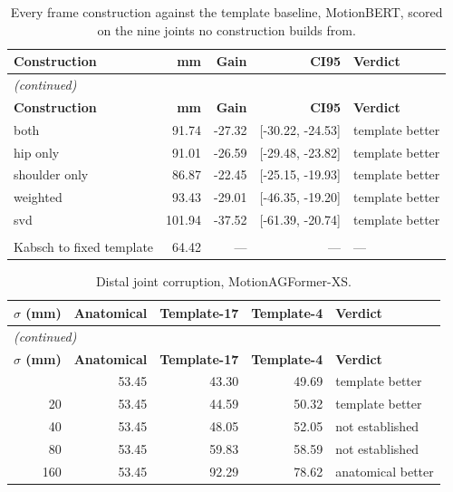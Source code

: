 \vspace{0.6cm}

\begin{center}
{\fontsize{10}{12}\selectfont
\begin{longtable}{lrrrl}
\caption{Every frame construction against the template baseline, MotionBERT, scored on the nine joints no construction builds from.}\label{tab:appbestframe_motionbert}\\
\hline
\textbf{Construction} & \textbf{mm} & \textbf{Gain} & \textbf{CI95} & \textbf{Verdict} \\
\hline
\endfirsthead
\multicolumn{5}{l}{\textit{(continued)}}\\
\hline
\textbf{Construction} & \textbf{mm} & \textbf{Gain} & \textbf{CI95} & \textbf{Verdict} \\
\hline
\endhead
\hline
\endfoot
both & 91.74 & -27.32 & [-30.22, -24.53] & template better \\
hip only & 91.01 & -26.59 & [-29.48, -23.82] & template better \\
shoulder only & 86.87 & -22.45 & [-25.15, -19.93] & template better \\
weighted & 93.43 & -29.01 & [-46.35, -19.20] & template better \\
svd & 101.94 & -37.52 & [-61.39, -20.74] & template better \\
\hline \\
Kabsch to fixed template & 64.42 & --- & --- & --- \\
\end{longtable}
}
\end{center}

\vspace{0.6cm}

\begin{center}
{\fontsize{10}{12}\selectfont
\begin{longtable}{rrrrl}
\caption{Distal joint corruption, MotionAGFormer-XS.}\label{tab:appocclusion_xs}\\
\hline
\textbf{$\sigma$ (mm)} & \textbf{Anatomical} & \textbf{Template-17} & \textbf{Template-4} & \textbf{Verdict} \\
\hline
\endfirsthead
\multicolumn{5}{l}{\textit{(continued)}}\\
\hline
\textbf{$\sigma$ (mm)} & \textbf{Anatomical} & \textbf{Template-17} & \textbf{Template-4} & \textbf{Verdict} \\
\hline
\endhead
\hline
\endfoot
0 & 53.45 & 43.30 & 49.69 & template better \\
20 & 53.45 & 44.59 & 50.32 & template better \\
40 & 53.45 & 48.05 & 52.05 & not established \\
80 & 53.45 & 59.83 & 58.59 & not established \\
160 & 53.45 & 92.29 & 78.62 & anatomical better \\
\end{longtable}
}
\end{center}

